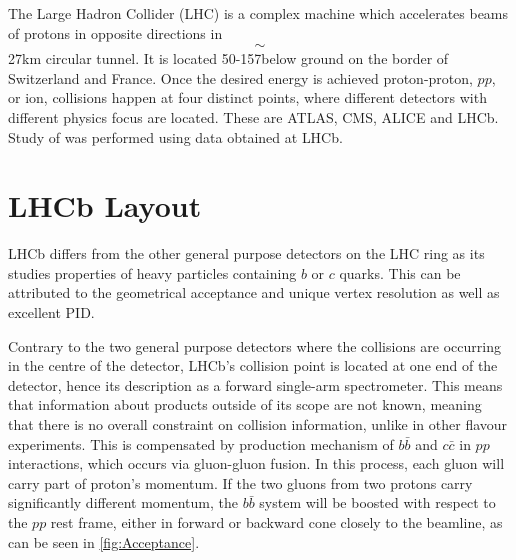 The Large Hadron Collider (LHC) is a complex machine which accelerates beams of protons in opposite directions in $$\sim$$ 27km circular tunnel. It is located
50-157\m below ground on the border of Switzerland and France. Once the desired energy is achieved proton-proton, $pp$, or ion, collisions happen at four distinct points, where different detectors with different physics focus are located. These are \Gls{ATLAS}, \Gls{CMS}, \Gls{ALICE} and \Gls{LHCb}. 
Study of \Bmumumu was performed using data obtained at \Gls{LHCb}. 

\section{LHCb Layout}

\Gls{LHCb} differs from the other general purpose detectors on the LHC ring as its studies properties of heavy particles containing $b$ or $c$ quarks. This can be attributed to the geometrical acceptance and unique vertex resolution as well as excellent \Gls{PID}.

Contrary to the two general purpose detectors where the collisions are occurring in the centre of the detector, \Gls{LHCb}'s collision point is located at one end of the detector, hence its description as a forward single-arm spectrometer. This means that information about products outside of its scope are not known, meaning that there is no overall constraint on collision information, unlike in other flavour experiments. This is compensated by production mechanism of $b\bar{b}$ and $c\bar{c}$ in $pp$ interactions, which occurs via gluon-gluon fusion. In this process, each gluon will carry part of proton's momentum. If the two gluons from two protons carry significantly different momentum, the $b\bar{b}$ system will be boosted with respect to the $pp$ rest frame, either in forward or backward cone closely to the beamline, as can be seen in \autoref{fig:Acceptance}.

